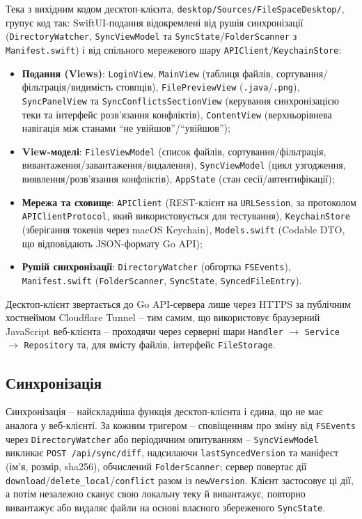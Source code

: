\documentclass[12pt,a4paper]{article}
\begin{document}
Тека з вихідним кодом десктоп-клієнта, \texttt{desktop/Sources/\allowbreak FileSpaceDesktop/}, групує код так: SwiftUI-подання відокремлені від рушія синхронізації (\texttt{DirectoryWatcher}, \texttt{SyncViewModel} та \texttt{SyncState}/\texttt{FolderScanner} з \texttt{Manifest.swift}) і від спільного мережевого шару \texttt{APIClient}/\texttt{KeychainStore}:

\begin{itemize}[nosep]
    \item \textbf{Подання (Views)}: \texttt{LoginView}, \texttt{MainView} (таблиця файлів, сортування/фільтрація/видимість стовпців), \texttt{FilePreviewView} (\texttt{.java}/\texttt{.png}), \texttt{SyncPanelView} та \texttt{SyncConflicts\allowbreak SectionView} (керування синхронізацією теки та інтерфейс розв'язання конфліктів), \texttt{ContentView} (верхньорівнева навігація між станами ``не увійшов''/``увійшов'');
    \item \textbf{View-моделі}: \texttt{FilesViewModel} (список файлів, сортування/фільтрація, вивантаження/завантаження/видалення), \texttt{SyncViewModel} (цикл узгодження, виявлення/розв'язання конфліктів), \texttt{AppState} (стан сесії/автентифікації);
    \item \textbf{Мережа та сховище}: \texttt{APIClient} (REST-клієнт на \texttt{URLSession}, за протоколом \texttt{APIClientProtocol}, який використовується для тестування), \texttt{KeychainStore} (зберігання токенів через macOS Keychain), \texttt{Models.swift} (Codable DTO, що відповідають JSON-формату Go API);
    \item \textbf{Рушій синхронізації}: \texttt{DirectoryWatcher} (обгортка \texttt{FSEvents}), \texttt{Manifest.swift} (\texttt{FolderScanner}, \texttt{SyncState}, \texttt{SyncedFileEntry}).
\end{itemize}

Десктоп-клієнт звертається до Go API-сервера лише через HTTPS за публічним хостнеймом Cloudflare Tunnel -- тим самим, що використовує браузерний JavaScript веб-клієнта -- проходячи через серверні шари \texttt{Handler} $\to$ \texttt{Service} $\to$ \texttt{Repository} та, для вмісту файлів, інтерфейс \texttt{FileStorage}.

\subsection{Синхронізація}

Синхронізація -- найскладніша функція десктоп-клієнта і єдина, що не має аналога у веб-клієнті. За кожним тригером -- сповіщенням про зміну від \texttt{FSEvents} через \texttt{DirectoryWatcher} або періодичним опитуванням -- \texttt{SyncViewModel} викликає \texttt{POST /api/sync/diff}, надсилаючи \texttt{lastSyncedVersion} та маніфест (ім'я, розмір, sha256), обчислений \texttt{FolderScanner}; сервер повертає дії \texttt{download}/\texttt{delete\_local}/\texttt{conflict} разом із \texttt{newVersion}. Клієнт застосовує ці дії, а потім незалежно сканує свою локальну теку й вивантажує, повторно вивантажує або видаляє файли на основі власного збереженого \texttt{SyncState}.
\end{document}
